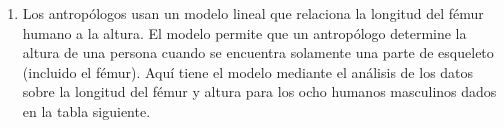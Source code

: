 \begin{enumerate}
\begin{enumerate}[\bfseries (a)]
    \end{enumerate}

    \item Los antropólogos usan un modelo lineal que relaciona la longitud del fémur humano a la altura. El modelo permite que un antropólogo determine la altura de una persona cuando se encuentra solamente una parte de esqueleto (incluido el fémur). Aquí tiene el modelo mediante el análisis de los datos sobre la longitud del fémur y altura para los ocho humanos masculinos dados en la tabla siguiente.

\end{enumerate}
